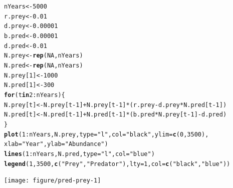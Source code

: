 \documentclass[12pt]{article}\usepackage[]{graphicx}\usepackage[]{color}
\makeatletter
\newcommand{\hlnum}[1]{\textcolor[rgb]{0.686,0.059,0.569}{#1}}%
\newcommand{\hlstr}[1]{\textcolor[rgb]{0.192,0.494,0.8}{#1}}%
\newcommand{\hlopt}[1]{\textcolor[rgb]{0,0,0}{#1}}%
\newcommand{\hlstd}[1]{\textcolor[rgb]{0.345,0.345,0.345}{#1}}%
\newcommand{\hlkwa}[1]{\textcolor[rgb]{0.161,0.373,0.58}{\textbf{#1}}}%
\newcommand{\hlkwb}[1]{\textcolor[rgb]{0.69,0.353,0.396}{#1}}%
\newcommand{\hlkwc}[1]{\textcolor[rgb]{0.333,0.667,0.333}{#1}}%
\newcommand{\hlkwd}[1]{\textcolor[rgb]{0.737,0.353,0.396}{\textbf{#1}}}%
\newenvironment{kframe}{%
 \def\at@end@of@kframe{}%
 \ifinner\ifhmode%
  \def\at@end@of@kframe{\end{minipage}}%
  \begin{minipage}{\columnwidth}%
 \fi\fi%
 \def\FrameCommand##1{\hskip\@totalleftmargin \hskip-\fboxsep
 \colorbox{shadecolor}{##1}\hskip-\fboxsep
     \hskip-\linewidth \hskip-\@totalleftmargin \hskip\columnwidth}%
 \MakeFramed {\advance\hsize-\width
   \@totalleftmargin\z@ \linewidth\hsize
   \@setminipage}}%
 {\par\unskip\endMakeFramed%
 \at@end@of@kframe}
\newenvironment{knitrout}{}{} %
\makeatother
\begin{document}
\begin{knitrout}
\color{fgcolor}\begin{kframe}
\begin{alltt}
\hlstd{nYears} \hlkwb{<-} \hlnum{5000}
\hlstd{r.prey} \hlkwb{<-} \hlnum{0.01}
\hlstd{d.prey} \hlkwb{<-} \hlnum{0.00001}
\hlstd{b.pred} \hlkwb{<-} \hlnum{0.00001}
\hlstd{d.pred} \hlkwb{<-} \hlnum{0.01}
\hlstd{N.prey} \hlkwb{<-} \hlkwd{rep}\hlstd{(}\hlnum{NA}\hlstd{, nYears)}
\hlstd{N.pred} \hlkwb{<-} \hlkwd{rep}\hlstd{(}\hlnum{NA}\hlstd{, nYears)}
\hlstd{N.prey[}\hlnum{1}\hlstd{]} \hlkwb{<-} \hlnum{1000}
\hlstd{N.pred[}\hlnum{1}\hlstd{]} \hlkwb{<-} \hlnum{300}
\hlkwa{for}\hlstd{(t} \hlkwa{in} \hlnum{2}\hlopt{:}\hlstd{nYears) \{}
    \hlstd{N.prey[t]} \hlkwb{<-} \hlstd{N.prey[t}\hlopt{-}\hlnum{1}\hlstd{]} \hlopt{+} \hlstd{N.prey[t}\hlopt{-}\hlnum{1}\hlstd{]}\hlopt{*}\hlstd{(r.prey}\hlopt{-}\hlstd{d.prey}\hlopt{*}\hlstd{N.pred[t}\hlopt{-}\hlnum{1}\hlstd{])}
    \hlstd{N.pred[t]} \hlkwb{<-} \hlstd{N.pred[t}\hlopt{-}\hlnum{1}\hlstd{]} \hlopt{+} \hlstd{N.pred[t}\hlopt{-}\hlnum{1}\hlstd{]}\hlopt{*}\hlstd{(b.pred}\hlopt{*}\hlstd{N.prey[t}\hlopt{-}\hlnum{1}\hlstd{]} \hlopt{-} \hlstd{d.pred)}
\hlstd{\}}
\hlkwd{plot}\hlstd{(}\hlnum{1}\hlopt{:}\hlstd{nYears, N.prey,} \hlkwc{type}\hlstd{=}\hlstr{"l"}\hlstd{,} \hlkwc{col}\hlstd{=}\hlstr{"black"}\hlstd{,} \hlkwc{ylim}\hlstd{=}\hlkwd{c}\hlstd{(}\hlnum{0}\hlstd{,} \hlnum{3500}\hlstd{),}
     \hlkwc{xlab}\hlstd{=}\hlstr{"Year"}\hlstd{,} \hlkwc{ylab}\hlstd{=}\hlstr{"Abundance"}\hlstd{)}
\hlkwd{lines}\hlstd{(}\hlnum{1}\hlopt{:}\hlstd{nYears, N.pred,} \hlkwc{type}\hlstd{=}\hlstr{"l"}\hlstd{,} \hlkwc{col}\hlstd{=}\hlstr{"blue"}\hlstd{)}
\hlkwd{legend}\hlstd{(}\hlnum{1}\hlstd{,} \hlnum{3500}\hlstd{,} \hlkwd{c}\hlstd{(}\hlstr{"Prey"}\hlstd{,} \hlstr{"Predator"}\hlstd{),} \hlkwc{lty}\hlstd{=}\hlnum{1}\hlstd{,} \hlkwc{col}\hlstd{=}\hlkwd{c}\hlstd{(}\hlstr{"black"}\hlstd{,} \hlstr{"blue"}\hlstd{))}
\end{alltt}
\end{kframe}

{\centering \texttt{[image: figure/pred-prey-1]} 

}


\end{knitrout}
\end{document}
